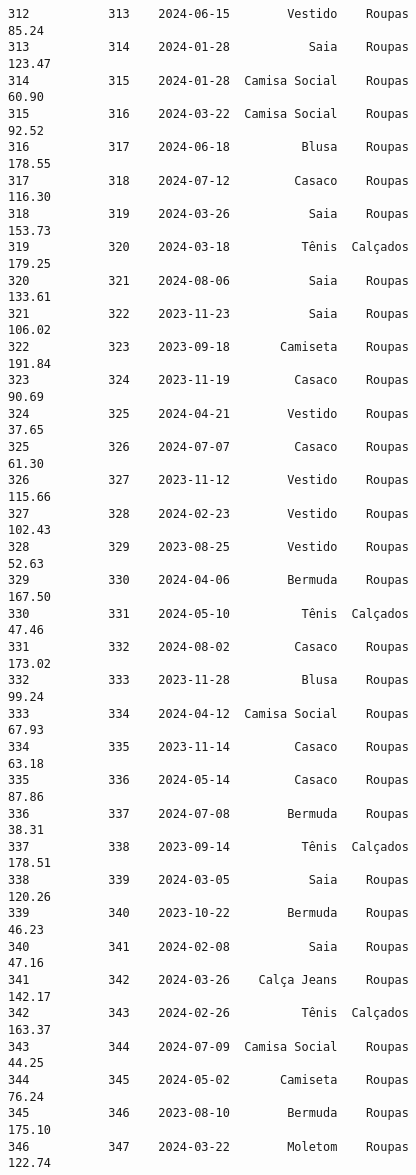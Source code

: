 \documentclass[11pt]{article}
\begin{document}
\begin{Verbatim}[commandchars=\\\{\}]
312           313    2024-06-15        Vestido    Roupas           85.24   
313           314    2024-01-28           Saia    Roupas          123.47   
314           315    2024-01-28  Camisa Social    Roupas           60.90   
315           316    2024-03-22  Camisa Social    Roupas           92.52   
316           317    2024-06-18          Blusa    Roupas          178.55   
317           318    2024-07-12         Casaco    Roupas          116.30   
318           319    2024-03-26           Saia    Roupas          153.73   
319           320    2024-03-18          Tênis  Calçados          179.25   
320           321    2024-08-06           Saia    Roupas          133.61   
321           322    2023-11-23           Saia    Roupas          106.02   
322           323    2023-09-18       Camiseta    Roupas          191.84   
323           324    2023-11-19         Casaco    Roupas           90.69   
324           325    2024-04-21        Vestido    Roupas           37.65   
325           326    2024-07-07         Casaco    Roupas           61.30   
326           327    2023-11-12        Vestido    Roupas          115.66   
327           328    2024-02-23        Vestido    Roupas          102.43   
328           329    2023-08-25        Vestido    Roupas           52.63   
329           330    2024-04-06        Bermuda    Roupas          167.50   
330           331    2024-05-10          Tênis  Calçados           47.46   
331           332    2024-08-02         Casaco    Roupas          173.02   
332           333    2023-11-28          Blusa    Roupas           99.24   
333           334    2024-04-12  Camisa Social    Roupas           67.93   
334           335    2023-11-14         Casaco    Roupas           63.18   
335           336    2024-05-14         Casaco    Roupas           87.86   
336           337    2024-07-08        Bermuda    Roupas           38.31   
337           338    2023-09-14          Tênis  Calçados          178.51   
338           339    2024-03-05           Saia    Roupas          120.26   
339           340    2023-10-22        Bermuda    Roupas           46.23   
340           341    2024-02-08           Saia    Roupas           47.16   
341           342    2024-03-26    Calça Jeans    Roupas          142.17   
342           343    2024-02-26          Tênis  Calçados          163.37   
343           344    2024-07-09  Camisa Social    Roupas           44.25   
344           345    2024-05-02       Camiseta    Roupas           76.24   
345           346    2023-08-10        Bermuda    Roupas          175.10   
346           347    2024-03-22        Moletom    Roupas          122.74   

\end{Verbatim}
\end{document}
